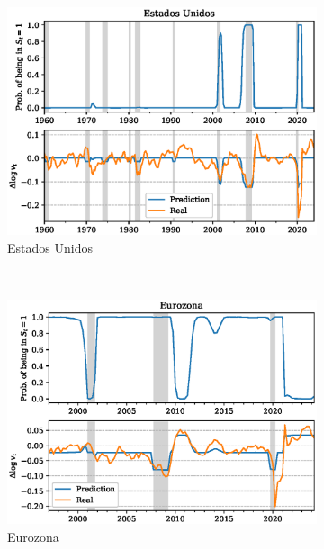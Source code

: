 \documentclass[titlepage, 12pt]{article}
\begin{document}
\begin{figure}
    \centering
    \begin{subfigure}[b]{0.49\textwidth}
        \includegraphics[width=\textwidth]{plots/us-markov-v.eps}
        \caption{Estados Unidos}
    \end{subfigure}
    ~
    \begin{subfigure}[b]{0.49\textwidth}
        \includegraphics[width=\textwidth]{plots/eu-markov-v.eps}
        \caption{Eurozona}
    \end{subfigure}
    ~
    \begin{subfigure}[b]{0.49\textwidth}

\end{subfigure}
\end{figure}
\end{document}
